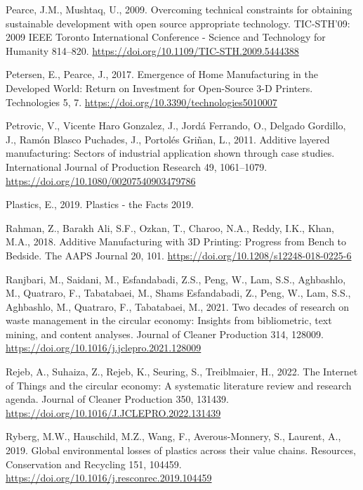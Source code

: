 \documentclass[
  11pt,
]{article}
\newlength{\cslhangindent}
\newlength{\cslentryspacingunit} %
\newenvironment{CSLReferences}[2] %
 {%
  \setlength{\parindent}{0pt}
  \ifodd #1
  \let\oldpar\par
  \def\par{\hangindent=\cslhangindent\oldpar}
  \fi
  \setlength{\parskip}{#2\cslentryspacingunit}
 }%
 {}
\begin{document}
\begin{CSLReferences}{1}{0}
\leavevmode{}%
Pearce, J.M., Mushtaq, U., 2009. Overcoming technical constraints for
obtaining sustainable development with open source appropriate
technology. TIC-STH'09: 2009 IEEE Toronto International Conference -
Science and Technology for Humanity 814--820.
\url{https://doi.org/10.1109/TIC-STH.2009.5444388}

\leavevmode{}%
Petersen, E., Pearce, J., 2017. Emergence of {Home Manufacturing} in the
{Developed World}: {Return} on {Investment} for {Open-Source} 3-{D
Printers}. Technologies 5, 7.
\url{https://doi.org/10.3390/technologies5010007}

\leavevmode{}%
Petrovic, V., Vicente Haro Gonzalez, J., Jordá Ferrando, O., Delgado
Gordillo, J., Ramón Blasco Puchades, J., Portolés Griñan, L., 2011.
Additive layered manufacturing: Sectors of industrial application shown
through case studies. International Journal of Production Research 49,
1061--1079. \url{https://doi.org/10.1080/00207540903479786}

\leavevmode{}%
Plastics, E., 2019. Plastics - the {Facts} 2019.

\leavevmode{}%
Rahman, Z., Barakh Ali, S.F., Ozkan, T., Charoo, N.A., Reddy, I.K.,
Khan, M.A., 2018. Additive {Manufacturing} with {3D Printing}:
{Progress} from {Bench} to {Bedside}. The AAPS Journal 20, 101.
\url{https://doi.org/10.1208/s12248-018-0225-6}

\leavevmode{}%
Ranjbari, M., Saidani, M., Esfandabadi, Z.S., Peng, W., Lam, S.S.,
Aghbashlo, M., Quatraro, F., Tabatabaei, M., Shams Esfandabadi, Z.,
Peng, W., Lam, S.S., Aghbashlo, M., Quatraro, F., Tabatabaei, M., 2021.
Two decades of research on waste management in the circular economy:
{Insights} from bibliometric, text mining, and content analyses. Journal
of Cleaner Production 314, 128009.
\url{https://doi.org/10.1016/j.jclepro.2021.128009}

\leavevmode{}%
Rejeb, A., Suhaiza, Z., Rejeb, K., Seuring, S., Treiblmaier, H., 2022.
The {Internet} of {Things} and the circular economy: {A} systematic
literature review and research agenda. Journal of Cleaner Production
350, 131439. \url{https://doi.org/10.1016/J.JCLEPRO.2022.131439}

\leavevmode{}%
Ryberg, M.W., Hauschild, M.Z., Wang, F., Averous-Monnery, S., Laurent,
A., 2019. Global environmental losses of plastics across their value
chains. Resources, Conservation and Recycling 151, 104459.
\url{https://doi.org/10.1016/j.resconrec.2019.104459}


\end{CSLReferences}
\end{document}
